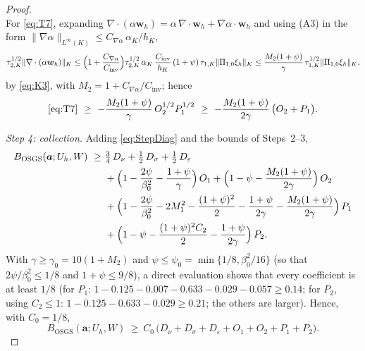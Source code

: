 \documentclass[11pt]{article}
\theoremstyle{remark}
\newcommand{\bw}{\boldsymbol{w}}
\newcommand{\ba}{\boldsymbol{a}}
\newcommand{\norm}[1]{\lVert #1 \rVert}
\newcommand{\normK}[1]{\lVert #1 \rVert_{K}}
\newcommand{\Ponez}{\Pi_{1,0}}
\begin{document}
\begin{proof}
\[\]
For \cref{eq:T7}, expanding
$\nabla\cdot(\alpha\bw_h) = \alpha\,\nabla\cdot\bw_h + \nabla\alpha\cdot\bw_h$ and
using (A3) in the form
$\norm{\nabla\alpha}_{L^\infty(K)} \le C_{\nabla\alpha}\,\alpha_K/h_K$,
\[
  \tau_{2,K}^{1/2}\normK{\nabla\cdot(\alpha\bw_h)}
  \le \Bigl(1 + \frac{C_{\nabla\alpha}}{C_{\mathrm{inv}}}\Bigr)
  \tau_{2,K}^{1/2}\,\alpha_K\,\frac{C_{\mathrm{inv}}}{h_K}\,
  (1+\psi)\,\tau_{1,K}\normK{\Ponez\xi_h}
  \le \frac{M_2(1+\psi)}{\gamma}\,\tau_{1,K}^{1/2}\normK{\Ponez\xi_h},
\]
by \cref{eq:K3}, with $M_2 = 1 + C_{\nabla\alpha}/C_{\mathrm{inv}}$; hence
\[
  \text{\cref{eq:T7}}
  \ \ge\ -\frac{M_2(1+\psi)}{\gamma}\, O_2^{1/2} P_1^{1/2}
  \ \ge\ -\frac{M_2(1+\psi)}{2\gamma}\,\bigl( O_2 + P_1 \bigr).
\]

\medskip\noindent\emph{Step 4: collection.}
Adding \cref{eq:StepDiag} and the bounds of Steps~2--3,
\begin{align*}
  B_{\mathrm{OSGS}}(\ba; U_h, W)
  \ \ge\ & \tfrac34\, D_\nu + \tfrac12\, D_\sigma + \tfrac12\, D_\varepsilon\\
  &+ \Bigl( 1 - \frac{2\psi}{\beta_0^2} - \frac{1+\psi}{\gamma} \Bigr)\, O_1
  + \Bigl( 1 - \psi - \frac{M_2(1+\psi)}{2\gamma} \Bigr)\, O_2\\
  &+ \Bigl( 1 - \frac{2\psi}{\beta_0^2} - 2M_1^2 - \frac{(1+\psi)^2}{2}
  - \frac{1+\psi}{2\gamma} - \frac{M_2(1+\psi)}{2\gamma} \Bigr)\, P_1\\
  &+ \Bigl( 1 - \psi - \frac{(1+\psi)^2 C_2}{2} - \frac{1+\psi}{2\gamma} \Bigr)\, P_2 .
\end{align*}
With $\gamma \ge \gamma_0 = 10(1+M_2)$ and
$\psi \le \psi_0 = \min\{1/8, \beta_0^2/16\}$ (so that $2\psi/\beta_0^2 \le 1/8$ and
$1+\psi \le 9/8$), a direct evaluation shows that every coefficient is at least
$1/8$ (for $P_1$: $1 - 0.125 - 0.007 - 0.633 - 0.029 - 0.057 \ge 0.14$; for $P_2$,
using $C_2 \le 1$: $1 - 0.125 - 0.633 - 0.029 \ge 0.21$; the others are larger).
Hence, with $C_0 = 1/8$,
\begin{equation}
  \label{eq:Collected}
  B_{\mathrm{OSGS}}(\ba; U_h, W)
  \ \ge\ C_0\,\bigl( D_\nu + D_\sigma + D_\varepsilon + O_1 + O_2 + P_1 + P_2 \bigr).
\end{equation}


\end{proof}
\end{document}
